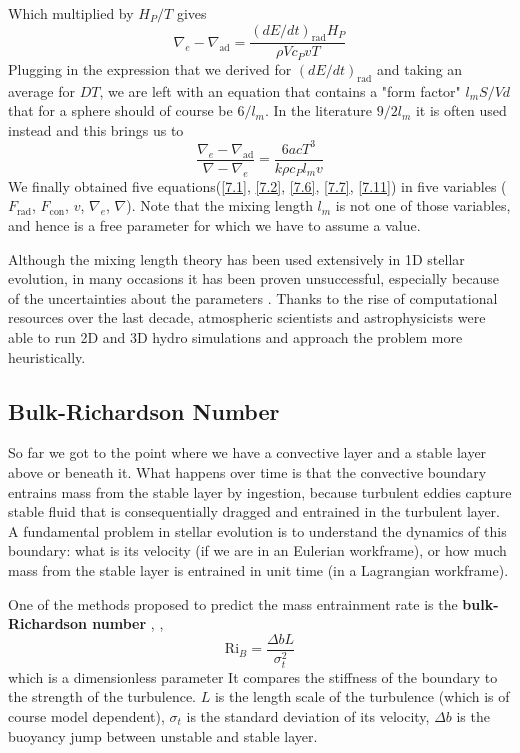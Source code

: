 Which multiplied by $H_P/T$ gives
\begin{equation}
\nabla_e - \nabla_{\mathrm{ad}} =  \frac{\left( dE/dt \right)_{ \mathrm{rad} } H_P}{\rho V c_P v T}
\end{equation}
Plugging in the expression that we derived for $(dE/dt)_{\mathrm{rad}}$ and taking an average for $DT$, we are left with an equation that contains a "form factor" $l_m S/Vd$ that for a sphere should of course be $6/l_m$. In the literature $9/2l_m$ it is often used instead and this brings us to
\begin{equation}\label{7.11}
\frac{\nabla_e - \nabla_{\mathrm{ad}}}{\nabla - \nabla_e} = \frac{6acT^3}{k \rho c_P l_m v}
\end{equation}
We finally obtained five equations(\ref{7.1}, \ref{7.2}, \ref{7.6}, \ref{7.7}, \ref{7.11}) in five variables ($F_{\mathrm{rad}}$, $F_{\mathrm{con}}$, $v$, $\nabla_e$, $\nabla$). Note that the mixing length $l_m$ is not one of those variables, and hence is a free parameter for which we have to assume a value. 

Although the mixing length theory has been used extensively in 1D stellar evolution, in many occasions it has been proven unsuccessful, especially because of the uncertainties about the parameters \citet{viallet2015}. Thanks to the rise of computational resources over the last decade, atmospheric scientists and astrophysicists were able to run 2D and 3D hydro simulations and approach the problem more heuristically.


\subsection{Bulk-Richardson Number}

So far we got to the point where we have a convective layer and a stable layer above or beneath it. What happens over time is that the convective boundary entrains mass from the stable layer by ingestion, because turbulent eddies capture stable fluid that is consequentially dragged and entrained in the turbulent layer. A fundamental problem in stellar evolution is to understand the dynamics of this boundary: what is its velocity (if we are in an Eulerian workframe), or how much mass from the stable layer is entrained in unit time (in a Lagrangian workframe).

One of the methods proposed to predict the mass entrainment rate is the \textbf{bulk-Richardson number} \citet{meakin}, \citet{viallet2015}, \citet{cristini} 
\begin{equation}\label{bulkrichardson}
	\mathrm{Ri}_{B}=\frac{\Delta b L}{\sigma_t^2}
\end{equation}
which is a dimensionless parameter  It compares the stiffness of the boundary to the strength of the turbulence. $L$ is the length scale of the turbulence (which is of course model dependent), $\sigma_t$ is the standard deviation of its velocity, $\Delta b$ is the buoyancy jump between unstable and stable layer.

